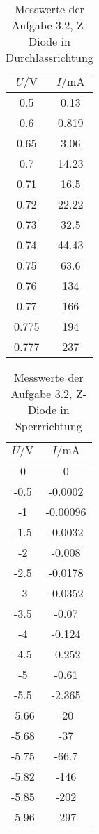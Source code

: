 \documentclass[a4paper, 12pt]{article}
\begin{document}
\begin{table}[H]
\begin{center}
\begin{tabular}{@{}c|c@{}}
\toprule
$U / \si{\volt}$     & $I / \si{\milli\ampere}$     \\ \midrule
0.5   & 0.13  \\
0.6   & 0.819 \\
0.65  & 3.06  \\
0.7   & 14.23 \\
0.71  & 16.5  \\
0.72  & 22.22 \\
0.73  & 32.5  \\
0.74  & 44.43 \\
0.75  & 63.6  \\
0.76  & 134   \\
0.77  & 166   \\
0.775 & 194   \\
0.777 & 237   \\ \bottomrule
\end{tabular}
\end{center}
\caption{Messwerte der Aufgabe 3.2, Z-Diode in Durchlassrichtung}
\end{table}

\begin{table}[H]
\begin{center}
\begin{tabular}{@{}c|c@{}}
\toprule
$U / \si{\volt}$     & $I / \si{\milli\ampere}$        \\ \midrule
0     & 0        \\
-0.5  & -0.0002  \\
-1    & -0.00096 \\
-1.5  & -0.0032  \\
-2    & -0.008   \\
-2.5  & -0.0178  \\
-3    & -0.0352  \\
-3.5  & -0.07    \\
-4    & -0.124   \\
-4.5  & -0.252   \\
-5    & -0.61    \\
-5.5  & -2.365   \\
-5.66 & -20      \\
-5.68 & -37      \\
-5.75 & -66.7    \\
-5.82 & -146     \\
-5.85 & -202     \\
-5.96 & -297     \\ \bottomrule
\end{tabular}
\end{center}
\caption{Messwerte der Aufgabe 3.2, Z-Diode in Sperrrichtung}
\end{table}
\end{document}
